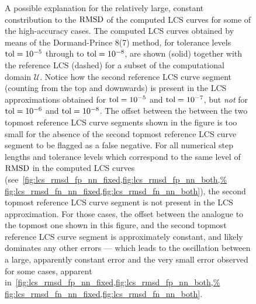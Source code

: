 \begin{figure}[htpb]
    \centering
    
    \caption[A possible explanation for the relatively large, constant
    contribution to the $\rmsd$ of the
    computed LCS curves for some of the high-accuracy cases]
    {A possible explanation for the relatively large, constant constribution to
        the $\rmsd$ of the computed LCS curves for some of the high-accuracy
        cases. The computed LCS curves obtained by
        means of the Dormand-Prince 8(7) method, for tolerance levels
        $\textnormal{tol}=10^{-5}$ through to $\textnormal{tol}=10^{-8}$, are shown
        (solid) together with the reference LCS (dashed) for a subset of the
        computational domain $\mathcal{U}$. Notice how the second reference LCS
        curve segment (counting from the top and downwards) is present in the LCS
        approximations obtained for $\textnormal{tol}=10^{-5}$ and
        $\textnormal{tol}=10^{-7}$, but \emph{not} for $\textnormal{tol}=10^{-6}$
        and $\textnormal{tol}=10^{-8}$. The offset between the between the two
        topmost reference LCS curve segments shown in the figure is too small for the
        absence of the second topmost reference LCS curve segment to be flagged as a
        false negative. For all numerical step lengths and tolerance levels which
        correspond to the same level of $\rmsd$ in the computed LCS curves
        (see~\cref{fig:lcs_rmsd_fp_nn_fixed,fig:lcs_rmsd_fp_nn_both,%
        fig:lcs_rmsd_fn_nn_fixed,fig:lcs_rmsd_fn_nn_both}), the second topmost reference
        LCS curve segment is not present in the LCS approximation. For those cases,
        the offset between the analogue to the topmost one shown in this figure, and
        the second topmost reference LCS curve segment is approximately constant, and
        likely dominates any other errors --- which leads to the oscillation between
        a large, apparently constant error and the very small error observed for some
        cases, apparent in~\cref{fig:lcs_rmsd_fp_nn_fixed,fig:lcs_rmsd_fp_nn_both,%
    fig:lcs_rmsd_fn_nn_fixed,fig:lcs_rmsd_fn_nn_both}.}
    \label{fig:lcserroroscillations}
\end{figure}
